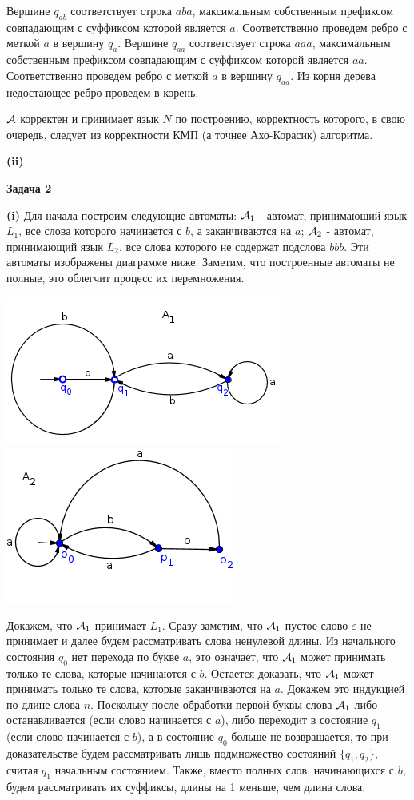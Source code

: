 \documentclass[10pt]{article}
\let \eps \varepsilon
\begin{document}
Вершине $q_{ab}$ соответствует строка $aba$, максимальным собственным префиксом совпадающим с суффиксом которой является $a$. Соответственно проведем ребро с меткой $a$ в вершину $q_a$. Вершине $q_{aa}$ соответствует строка $aaa$, максимальным собственным префиксом совпадающим с суффиксом которой является $aa$. Соответственно проведем ребро с меткой $a$ в вершину $q_{aa}$. Из корня дерева недостающее ребро проведем в корень.

${\cal A}$ корректен и принимает язык $N$ по построению, корректность которого, в свою очередь, следует из корректности КМП (а точнее Ахо-Корасик) алгоритма.

{\bf (ii)}


\medskip

{\bf Задача 2}

{\bf (i)}
Для начала построим следующие автоматы: ${\cal A}_1$ - автомат, принимающий язык $L_1$, все слова которого начинается с $b$, а заканчиваются на $a$; ${\cal A}_2$ - автомат, принимающий язык $L_2$, все слова которого не содержат подслова $bbb$. Эти автоматы изображены диаграмме ниже. Заметим, что построенные автоматы не полные, это облегчит процесс их перемножения.

\centerline{\includegraphics{image-2-a1.png} \includegraphics{image-2-a2.png}}

Докажем, что ${\cal A}_1$ принимает $L_1$. Сразу заметим, что ${\cal A}_1$ пустое слово $\eps$ не принимает и далее будем рассматривать слова ненулевой длины. Из начального состояния $q_0$ нет перехода по букве $a$, это означает, что ${\cal A}_1$ может принимать только те слова, которые начинаются с $b$. Остается доказать, что ${\cal A}_1$ может принимать только те слова, которые заканчиваются на $a$. Докажем это индукцией по длине слова $n$. Поскольку после обработки первой буквы слова ${\cal A}_1$ либо останавливается (если слово начинается с $a$), либо переходит в состояние $q_1$ (если слово начинается с $b$), а в состояние $q_0$ больше не возвращается, то при доказательстве будем рассматривать лишь подмножество состояний $\{ q_1, q_2 \}$, считая $q_1$ начальным состоянием. Также, вместо полных слов, начинающихся с $b$, будем рассматривать их суффиксы, длины на 1 меньше, чем длина слова.
\end{document}
